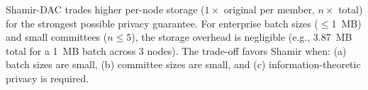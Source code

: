 \begin{table}[htbp]
\centering
\caption{Design Alternatives for Private Data Availability}
\label{tab:approaches}
\end{table}

Shamir-DAC trades higher per-node storage ($1\times$ original per member,
$n\times$ total) for the strongest possible privacy guarantee. For enterprise
batch sizes ($\leq$1~MB) and small committees ($n \leq 5$), the storage
overhead is negligible (e.g., 3.87~MB total for a 1~MB batch across 3 nodes).
The trade-off favors Shamir when: (a) batch sizes are small, (b) committee
sizes are small, and (c) information-theoretic privacy is required.
